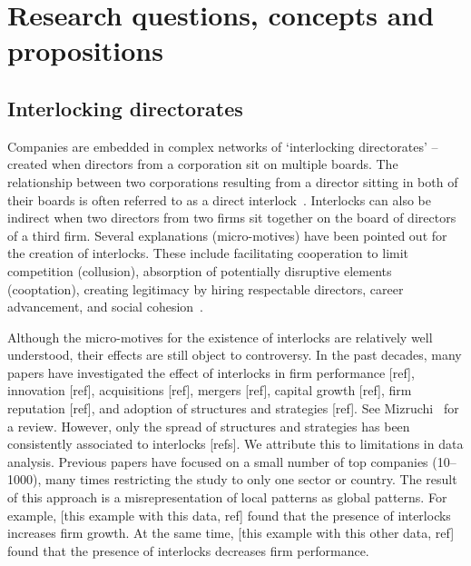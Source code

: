 \section{Research questions, concepts and propositions}
\label{sec:question}
\subsection{Interlocking directorates}
Companies are embedded in complex networks of `interlocking directorates' -- 
created when directors from a corporation sit on multiple boards.
The relationship between two corporations resulting from a director sitting in both of their boards is often referred to as a direct interlock~\citep{Mizruchi1996}.
Interlocks can also be indirect when two directors from two firms sit together on the board of directors of a third firm. 
Several explanations (micro-motives) have been pointed out for the creation of interlocks. 
These include facilitating cooperation to limit competition (collusion),  
absorption of potentially disruptive elements (cooptation), 
creating legitimacy by hiring respectable directors, 
career advancement, and social cohesion~\citep{Mizruchi1996}.

Although the micro-motives for the existence of interlocks are relatively well understood, 
their effects are still object to controversy. 
In the past decades, many papers have investigated the effect of interlocks in firm performance [ref], innovation [ref], acquisitions [ref], mergers [ref], capital growth [ref], firm reputation [ref], and adoption of structures and strategies [ref]. See Mizruchi~\cite{Mizruchi1996} for a review.
However, only the spread of structures and strategies has been consistently associated to interlocks [refs].
We attribute this to limitations in data analysis.
Previous papers have focused on a small number of top companies (10--1000), 
many times restricting the study to only one sector or country. 
The result of this approach is a misrepresentation of local patterns as global patterns.
For example, 
[this example with this data, ref] found that the presence of interlocks increases firm growth.
At the same time,
[this example with this other data, ref] found that the presence of interlocks decreases firm performance.




